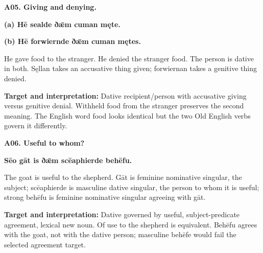 \par\begin{minipage}{\linewidth}\raggedright
\textbf{A05. Giving and denying.}

\textbf{(a) Hē sealde ðǣm cuman męte.}

\textbf{(b) Hē forwiernde ðǣm cuman mętes.}

He gave food to the stranger. He denied the stranger food. The person is dative in both. Sęllan takes an accusative thing given; forwiernan takes a genitive thing denied.

\textbf{Target and interpretation:} Dative recipient/\allowbreak{}person with accusative giving versus genitive denial. Withheld food from the stranger preserves the second meaning. The English word food looks identical but the two Old English verbs govern it differently.

\end{minipage}\par\addvspace{4pt}

\par\begin{minipage}{\linewidth}\raggedright
\textbf{A06. Useful to whom?}

\textbf{Sēo gāt is ðǣm scēaphierde behēfu.}

The goat is useful to the shepherd. Gāt is feminine nominative singular, the subject; scēaphierde is masculine dative singular, the person to whom it is useful; strong behēfu is feminine nominative singular agreeing with gāt.

\textbf{Target and interpretation:} Dative governed by useful, subject-predicate agreement, lexical new noun. Of use to the shepherd is equivalent. Behēfu agrees with the goat, not with the dative person; masculine behēfe would fail the selected agreement target.

\end{minipage}\par\addvspace{4pt}

